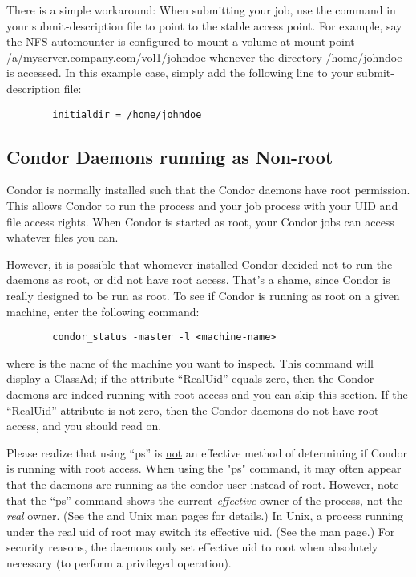 There is a simple workaround: When submitting your job, use the 
 command in your submit-description file to point to
the stable access point.  For example,
say the NFS automounter is configured to mount a volume at mount point
/a/myserver.company.com/vol1/johndoe whenever the directory /home/johndoe is
accessed.  In this example case, simply add the following line to your 
submit-description file:
\begin{verbatim}
        initialdir = /home/johndoe
\end{verbatim}

\subsection{Condor Daemons running as Non-root}

Condor is normally installed such that the Condor daemons have root
permission.  This allows Condor to run the  process and
your job process with your UID and file access rights.  When Condor
is started as root, your Condor jobs can access whatever files you can.

However, it is possible that whomever installed Condor decided not to
run the daemons as root, or did not have root access.  That's a shame, 
since Condor is really designed to be run as root.  To see if Condor is
running as root on a given machine, enter the following command:
\begin{verbatim}
        condor_status -master -l <machine-name>
\end{verbatim}

where  is the name of the machine you want to
inspect.  This command will display a  ClassAd; if the
attribute ``RealUid'' equals zero, then the Condor daemons are indeed
running with root access and you can skip this section.  If the
``RealUid'' attribute is not zero, then the Condor daemons do not have
root access, and you should read on.

Please realize that using ``ps'' is \underline{not} an effective
method of determining if Condor is running with root access.  When
using the "ps" command, it may often appear that the daemons are
running as the condor user instead of root.  However, note that the
``ps'' command shows the current \emph{effective} owner of the
process, not the \emph{real} owner.  (See the  and
 Unix man pages for details.)  In Unix, a process
running under the real uid of root may switch its effective uid.  (See
the  man page.)  For security reasons, the daemons
only set effective uid to root when absolutely necessary (to perform a
privileged operation).



